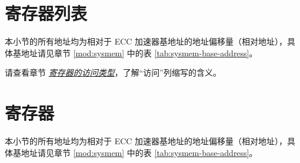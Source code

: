 \documentclass[main\_\_CN.tex]{subfiles}
\begin{document}
\clearpage
\hypertarget{ecc-reg-summ}{}
\section{寄存器列表}
\label{sec:ecc-reg-summ}

本小节的所有地址均为相对于 ECC 加速器基地址的地址偏移量（相对地址），具体基地址请见章节 \ref{mod:sysmem} \textit{} 中的表 \ref{tab:sysmem-base-address}。

请查看章节 \hyperref[glossary-access-types]{\textit{寄存器的访问类型}}，了解“访问”列缩写的含义。






\clearpage
\section{寄存器}

本小节的所有地址均为相对于 ECC 加速器基地址的地址偏移量（相对地址），具体基地址请见章节 \ref{mod:sysmem} \textit{} 中的表 \ref{tab:sysmem-base-address}。


\end{document}
